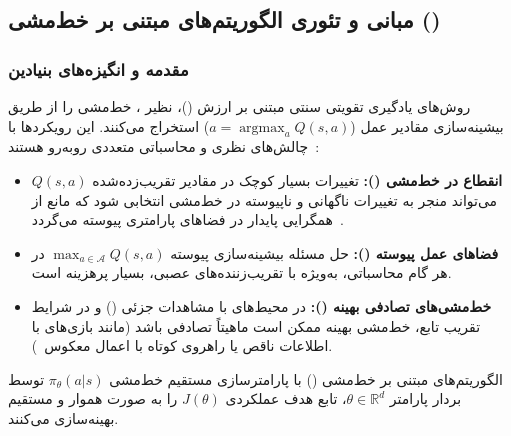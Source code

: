 \item
\subsection*{مبانی و تئوری الگوریتم‌های مبتنی بر خط‌مشی ()}

\subsubsection*{مقدمه و انگیزه‌های بنیادین}
روش‌های یادگیری تقویتی سنتی مبتنی بر ارزش ()، نظیر ، خط‌مشی را از طریق بیشینه‌سازی مقادیر عمل ($a = \operatorname{argmax}_a Q(s,a)$) استخراج می‌کنند. این رویکردها با چالش‌های نظری و محاسباتی متعددی روبه‌رو هستند~\cite{sutton2018reinforcement}:
\begin{itemize}
    \item \textbf{انقطاع در خط‌مشی ():} تغییرات بسیار کوچک در مقادیر تقریب‌زده‌شده $Q(s, a)$ می‌تواند منجر به تغییرات ناگهانی و ناپیوسته در خط‌مشی انتخابی شود که مانع از همگرایی پایدار در فضاهای پارامتری پیوسته می‌گردد~\cite{kakade2002approximately}.
    \item \textbf{فضاهای عمل پیوسته ():} حل مسئله بیشینه‌سازی پیوسته $\max_{a \in \mathcal{A}} Q(s, a)$ در هر گام محاسباتی، به‌ویژه با تقریب‌زننده‌های عصبی، بسیار پرهزینه است.
    \item \textbf{خط‌مشی‌های تصادفی بهینه ():} در محیط‌های با مشاهدات جزئی () و در شرایط تقریب تابع، خط‌مشی بهینه ممکن است ماهیتاً تصادفی باشد (مانند بازی‌های با اطلاعات ناقص یا راهروی کوتاه با اعمال معکوس~\cite{sutton2018reinforcement}).
\end{itemize}

الگوریتم‌های مبتنی بر خط‌مشی () با پارامترسازی مستقیم خط‌مشی $\pi_\theta(a|s)$ توسط بردار پارامتر $\theta \in \mathbb{R}^d$، تابع هدف عملکردی $J(\theta)$ را به صورت هموار و مستقیم بهینه‌سازی می‌کنند.

